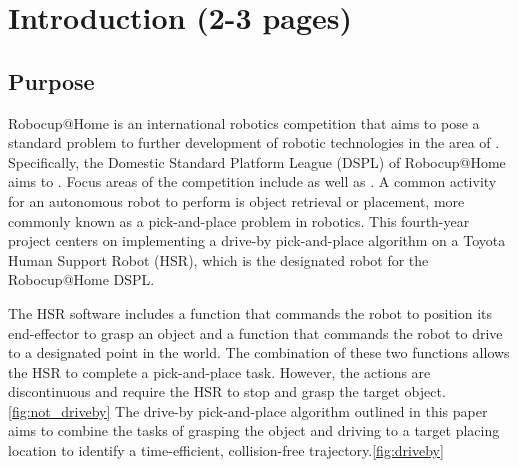 \documentclass[12pt]{article}
\begin{document}
\section{Introduction (2-3 pages)}
    \subsection{Purpose}
        Robocup@Home is an international robotics competition that aims to pose a standard problem to further development of robotic technologies in the area of \cite{noauthor_robocuphome_2020}. Specifically, the Domestic Standard Platform League (DSPL) of Robocup@Home aims to \cite{noauthor_robocuphome_2020}. Focus areas of the competition include  as well as \cite{noauthor_robocuphome_2020}. A common activity for an autonomous robot to perform is object retrieval or placement, more commonly known as a pick-and-place problem in robotics. This fourth-year project centers on implementing a drive-by pick-and-place algorithm on a Toyota Human Support Robot (HSR), which is the designated robot for the Robocup@Home DSPL. 

        The HSR software includes a function that commands the robot to position its end-effector to grasp an object and a function that commands the robot to drive to a designated point in the world. The combination of these two functions allows the HSR to complete a pick-and-place task. However, the actions are discontinuous and require the HSR to stop and grasp the target object.\cref{fig:not_driveby} The drive-by pick-and-place algorithm outlined in this paper aims to combine the tasks of grasping the object and driving to a target placing location to identify a time-efficient, collision-free trajectory.\cref{fig:driveby}
    
\end{document}
